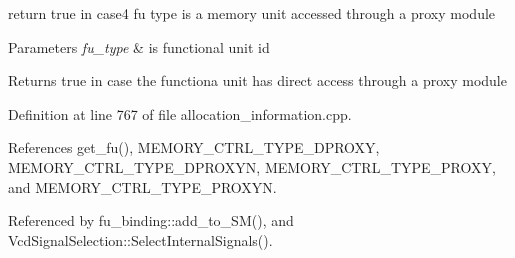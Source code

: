 return true in case4 fu type is a memory unit accessed through a proxy module 


\begin{DoxyParams}{Parameters}
{\em fu\+\_\+type} & is functional unit id \\
\hline
\end{DoxyParams}
\begin{DoxyReturn}{Returns}
true in case the functiona unit has direct access through a proxy module 
\end{DoxyReturn}


Definition at line 767 of file allocation\+\_\+information.\+cpp.



References get\+\_\+fu(), M\+E\+M\+O\+R\+Y\+\_\+\+C\+T\+R\+L\+\_\+\+T\+Y\+P\+E\+\_\+\+D\+P\+R\+O\+XY, M\+E\+M\+O\+R\+Y\+\_\+\+C\+T\+R\+L\+\_\+\+T\+Y\+P\+E\+\_\+\+D\+P\+R\+O\+X\+YN, M\+E\+M\+O\+R\+Y\+\_\+\+C\+T\+R\+L\+\_\+\+T\+Y\+P\+E\+\_\+\+P\+R\+O\+XY, and M\+E\+M\+O\+R\+Y\+\_\+\+C\+T\+R\+L\+\_\+\+T\+Y\+P\+E\+\_\+\+P\+R\+O\+X\+YN.



Referenced by fu\+\_\+binding\+::add\+\_\+to\+\_\+\+S\+M(), and Vcd\+Signal\+Selection\+::\+Select\+Internal\+Signals().

